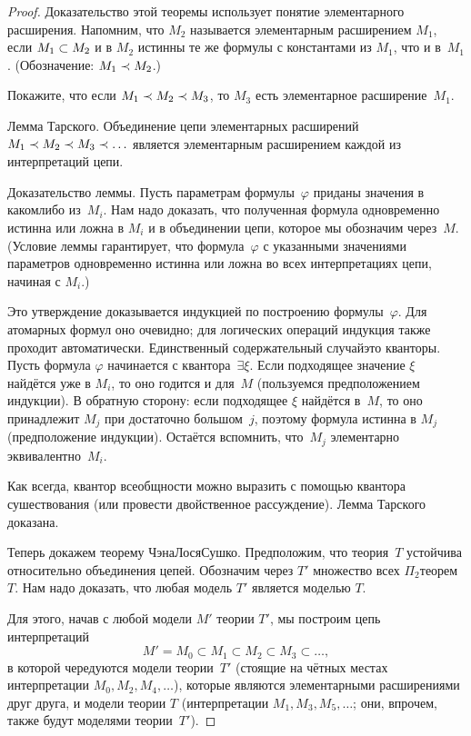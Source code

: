\begin{proof}
Доказательство этой теоремы использует понятие элементарного
расширения. Напомним, что $M_2$ называется элементарным
расширением $M_1$, если $M_1\hm\subset M_2$ и в $M_2$ истинны
те же формулы с константами из $M_1$, что и в~$M_1$.
(Обозначение: $M_1\hm\prec M_2$.)

\begin{problem}
Покажите, что если $M_1\hm\prec M_2 \hm\prec M_3$, то $M_3$
есть элементарное расширение~$M_1$.
\end{problem}

\textsf{Лемма Тарского}.%
%
%
Объединение цепи элементарных расширений $M_1\hm\prec
M_2\hm\prec M_3\hm\prec\ldots$ является элементарным расширением
каждой из интерпретаций цепи.

Доказательство леммы. Пусть параметрам формулы~$\varphi$ приданы
значения в каком\д либо из~$M_i$. Нам надо доказать, что
полученная формула одновременно истинна или ложна в $M_i$ и в
объединении цепи, которое мы обозначим через~$M$. (Условие
леммы гарантирует, что формула~$\varphi$ с указанными значениями параметров
одновременно истинна или ложна во всех интерпретациях цепи, начиная с $M_i$.)

Это утверждение доказывается индукцией по построению
формулы~$\varphi$. Для атомарных формул оно очевидно; для
логических операций индукция также проходит автоматически.
Единственный содержательный случай\т это кванторы. Пусть формула
$\varphi$ начинается с квантора~$\exists \xi$. Если подходящее
значение $\xi$ найдётся уже в $M_i$, то оно годится и для~$M$
(пользуемся предположением индукции). В обратную сторону: если
подходящее $\xi$ найдётся в~$M$, то оно принадлежит $M_j$ при
достаточно большом~$j$, поэтому формула истинна в $M_j$
(предположение индукции). Остаётся вспомнить, что~$M_j$
элементарно эквивалентно~$M_i$.

Как всегда, квантор всеобщности можно выразить с помощью квантора
сушествования (или провести двойственное рассуждение).
Лемма
Тарского доказана.

Теперь докажем теорему Чэна\Ч Лося\Ч Сушко. Предположим, что
теория~$T$ устойчива относительно объединения цепей. Обозначим
через $T'$ множество всех $\Pi_2$\д теорем $T$. Нам надо
доказать, что любая модель $T'$ является  моделью $T$.

Для этого, начав с любой модели $M'$ теории $T'$, мы построим
цепь интерпретаций
         $$
M'= M_0\subset M_1\subset M_2\subset M_3\subset\ldots,
         $$
в которой чередуются модели теории~$T'$ (стоящие на чётных местах интерпретации
$M_0,M_2,M_4,\dots$), которые являются элементарными
расширениями друг друга, и модели теории $T$ (интерпретации
$M_1,M_3,M_5,\dots$; они, впрочем, также будут моделями
теории~$T'$).


\end{proof}
